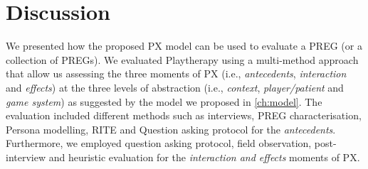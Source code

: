 \section{Discussion}

We presented how the proposed \ac{PX} model can be used to evaluate a \ac{PREG} (or a collection of \acp{PREG}). We evaluated Playtherapy using a multi-method approach that allow us assessing the three moments of \ac{PX} (i.e., \textit{antecedents}, \textit{interaction} and \textit{effects}) at the three levels of abstraction (i.e., \textit{context}, \textit{player/patient} and \textit{game system}) as suggested by the model we proposed in \autoref{ch:model}. The evaluation included different methods such as interviews, \ac{PREG} characterisation, Persona modelling, \ac{RITE} and Question asking protocol for the \textit{antecedents}. Furthermore, we employed question asking protocol, field observation, post-interview and heuristic evaluation for the \textit{interaction and effects} moments of \ac{PX}.

